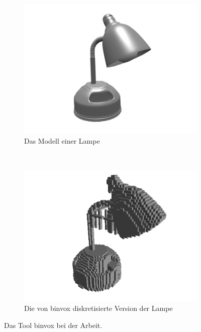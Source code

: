\begin{figure}
	\begin{subfigure}[t]{0.5\textwidth}
		\centering
		\includegraphics[width=\textwidth]{images/lamp_obj}
		\caption{Das Modell einer Lampe}
	\end{subfigure}
    ~
	\begin{subfigure}[t]{0.5\textwidth}
		\centering
		\includegraphics[width=\textwidth]{images/lamp_discrete}
		\caption{Die von binvox diskretisierte Version der Lampe}
	\end{subfigure}
	\caption{Das Tool binvox bei der Arbeit.}
\end{figure}